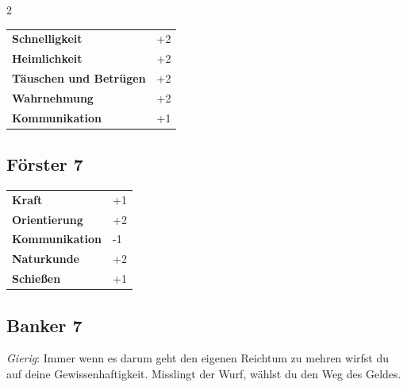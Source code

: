 \begin{multicols}{2}
\begin{tcolorbox}
\vspace{3mm}

\begin{tabular}{@{}ll@{}}
    \textbf{Schnelligkeit} & +2\\
    \textbf{Heimlichkeit} & +2\\
    \textbf{Täuschen und Betrügen} & +2\\
    \textbf{Wahrnehmung} & +2\\
    \textbf{Kommunikation} & +1\\
\end{tabular}


\end{tcolorbox}

\begin{tcolorbox}
    \subsection*{Förster \hfill \small{7 }}
    \tcblower




\begin{tabular}{@{}ll@{}}
    \textbf{Kraft} & +1\\
    \textbf{Orientierung} & +2\\
    \textbf{Kommunikation} & -1\\
    \textbf{Naturkunde} & +2\\
    \textbf{Schießen} & +1\\
\end{tabular}


\end{tcolorbox}

\begin{tcolorbox}
    \subsection*{Banker \hfill \small{7 }}
    \tcblower
\textit{Gierig}: Immer wenn es darum geht den eigenen Reichtum zu mehren wirfst du auf deine Gewissenhaftigkeit. Misslingt der Wurf, wählst du den Weg des Geldes.


\vspace{3mm}


\end{tcolorbox}
\end{multicols}
